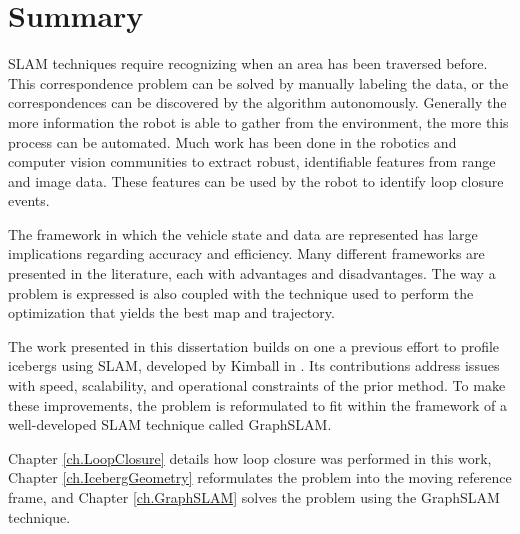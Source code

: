 \section{Summary}

SLAM techniques require recognizing when an area has been traversed before. This correspondence problem can be solved by manually labeling the data, or the correspondences can be discovered by the algorithm autonomously. Generally the more information the robot is able to gather from the environment, the more this process can be automated. Much work has been done in the robotics and computer vision communities to extract robust, identifiable features from range and image data. These features can be used by the robot to identify loop closure events. 

The framework in which the vehicle state and data are represented has large implications regarding accuracy and efficiency. Many different frameworks are presented in the literature, each with advantages and disadvantages. The way a problem is expressed is also coupled with the technique used to perform the optimization that yields the best map and trajectory.

The work presented in this dissertation builds on one a previous effort to profile icebergs using SLAM, developed by Kimball in \cite{Kimball2011b}. Its contributions address issues with speed, scalability, and operational constraints of the prior method. To make these improvements, the problem is reformulated to fit within the framework of a well-developed SLAM technique called GraphSLAM. 

Chapter \ref{ch.LoopClosure} details how loop closure was performed in this work, Chapter \ref{ch.IcebergGeometry} reformulates the problem into the moving reference frame, and Chapter  \ref{ch.GraphSLAM} solves the problem using the GraphSLAM technique.

